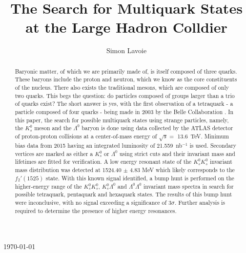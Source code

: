 \documentclass{article}
\title{The Search for Multiquark States at the Large Hadron Colldier}
\author{Simon Lavoie}
\begin{document}
\newpage
\maketitle

\begin{abstract}
  Baryonic matter, of which we are primarily made of, is itself composed of three quarks.
  These baryons include the proton and neutron, which we know as the core constituents of the 
  nucleus. There also exists the traditional mesons, which are composed of only two quarks. This begs the question:
  do particles composed of groups larger than a trio of quarks exist? The short answer is yes, 
  with the first observation of a tetraquark - a particle composed of four quarks - being made 
  in 2003 by the Belle Collaboration \cite{MultiquarkDiscovery}.
  In this paper, the search for possible multiquark states using strange particles, namely, the 
  $K^0_s$ meson and the $\Lambda^0$ baryon is done using data collected by the ATLAS detector 
  of proton-proton collisions at a center-of-mass energy of $\sqrt{s} =$ \SI{13.6}{TeV}. Minimum
  bias data from 2015 having an integrated luminosity of \SI{21.559}{nb}$^{-1}$ is used. Secondary 
  vertices are marked as either a $K^0_s$ or $\Lambda^0$ using strict cuts and their invariant mass and 
  lifetimes are fitted for verification. A low energy resonant state of the $K^0_sK^0_s$ invariant 
  mass distribution was detected at 1524.40 $\pm$ 4.83 MeV which likely corresponds to the 
  $f_2'(1525)$ state. With this known signal identified, a bump hunt is performed on the higher-energy
  range of the $K^0_sK^0_s$, $K^0_s\Lambda^0$ and $\Lambda^0\Lambda^0$ invariant mass spectra
  in search for possible tetraquark, pentaquark and hexaquark states. The results of this bump hunt 
  were inconclusive, with no signal exceeding a significance of $3\sigma$. Further analysis is required
  to determine the presence of higher energy resonances. 

\end{abstract}





\lstset{basicstyle=\ttfamily}
\pagestyle{fancy}
\chead{}
\lfoot{}
\cfoot{}
\rfoot{}
\renewcommand{\headrulewidth}{1pt}

\today
\end{document}
